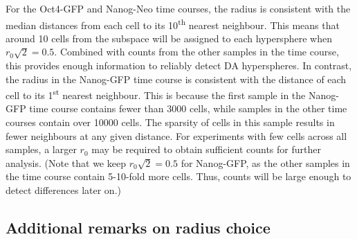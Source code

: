 \documentclass{article}
\begin{document}
For the Oct4-GFP and Nanog-Neo time courses, the radius is consistent with the median distances from each cell to its 10\textsuperscript{th} nearest neighbour.
This means that around 10 cells from the subspace will be assigned to each hypersphere when $r_0\sqrt{2}=0.5$.
Combined with counts from the other samples in the time course, this provides enough information to reliably detect DA hyperspheres.
In contrast, the radius in the Nanog-GFP time course is consistent with the distance of each cell to its 1\textsuperscript{st} nearest neighbour.
This is because the first sample in the Nanog-GFP time course contains fewer than 3000 cells, while samples in the other time courses contain over 10000 cells.
The sparsity of cells in this sample results in fewer neighbours at any given distance.
For experiments with few cells across all samples, a larger $r_0$ may be required to obtain sufficient counts for further analysis.
(Note that we keep $r_0\sqrt{2}=0.5$ for Nanog-GFP, as the other samples in the time course contain 5-10-fold more cells.
Thus, counts will be large enough to detect differences later on.)

\subsection{Additional remarks on radius choice}
\label{sec:additionalradius}
\end{document}
